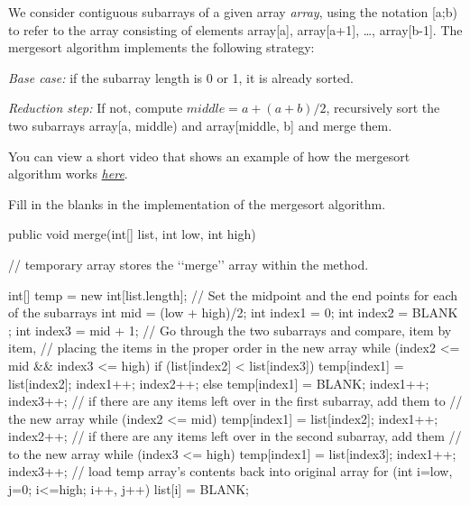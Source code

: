 We consider contiguous subarrays of a given array \textit{array}, using the notation [a;b) to refer to the array consisting of elements array[a], array[a+1], …, array[b-1]. The mergesort algorithm implements the following strategy:
   
\begin{itemsize}
\item \textit{Base case:} if the subarray length is 0 or 1, it is already sorted.
\item \textit{Reduction step:} If not, compute $middle = a + (a+b)/2$, recursively sort the two subarrays array[a, middle) and array[middle, b] and merge them.
\end{itemsize}

You can view a short video that shows an example of how the mergesort algorithm works \href{https://youtu.be/4VqmGXwpLqc}{\textit{here}}.




\begin{exercise}

Fill in the blanks in the implementation of the mergesort algorithm.
\begin{code}

public void merge(int[] list, int low, int high) {
// temporary array stores the ‘‘merge’’ array within the method.

int[] temp = new int[list.length];
    // Set the midpoint and the end points for each of the subarrays
    int mid = (low + high)/2;
    int index1 = 0;
    int index2 = BLANK ;
    int index3 = mid + 1;
    // Go through the two subarrays and compare, item by item,
    // placing the items in the proper order in the new array
    while (index2 <= mid && index3 <= high) {
        if (list[index2] < list[index3]) {
            temp[index1] = list[index2];
            index1++;
            index2++;
}
else {
            temp[index1] = BLANK;
            index1++;
            index3++;
} }
    // if there are any items left over in the first subarray, add them to
    // the new array
    while (index2 <= mid) {
        temp[index1] = list[index2];
        index1++;
        index2++;
}
    // if there are any items left over in the second subarray, add them
    // to the new array
    while (index3 <= high) {
        temp[index1] = list[index3];
        index1++;
        index3++;
}
    // load temp array’s contents back into original array
    for (int i=low, j=0; i<=high; i++, j++) {
        list[i] = BLANK;
    }
}

 
\end{code}
 

\end{exercise}
 
